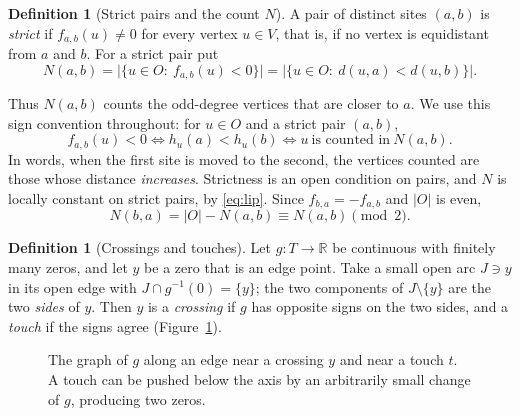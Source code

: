 \documentclass[11pt]{amsart}
\theoremstyle{definition}
\newtheorem{definition}[theorem]{Definition}
\theoremstyle{remark}
\newcommand{\Odd}{O}
\newcommand{\Ver}{V}
\newcommand{\N}{N}
\begin{document}
\begin{definition}[Strict pairs and the count $\N$]\label{def:strict}
A pair of distinct sites $(a,b)$ is \emph{strict} if $f_{a,b}(u)\ne0$ for every vertex $u\in\Ver$, that is, if no vertex is equidistant from $a$ and $b$. For a strict pair put
\[
  \N(a,b)=\bigl|\{u\in\Odd:\ f_{a,b}(u)<0\}\bigr| = \bigl|\{u\in\Odd:\ d(u,a)<d(u,b)\}\bigr|.
\]
\end{definition}

\noindent
Thus $\N(a,b)$ counts the odd-degree vertices that are closer to $a$. We use this sign convention throughout: for $u\in\Odd$ and a strict pair $(a,b)$,
\begin{equation}\label{eq:signconv}
  f_{a,b}(u)<0\iff h_u(a)<h_u(b)\iff u\ \text{is counted in}\ \N(a,b).
\end{equation}
In words, when the first site is moved to the second, the vertices counted are those whose distance \emph{increases}. Strictness is an open condition on pairs, and $\N$ is locally constant on strict pairs, by \eqref{eq:lip}. Since $f_{b,a}=-f_{a,b}$ and $|\Odd|$ is even,
\begin{equation}\label{eq:swap}
  \N(b,a)=|\Odd|-\N(a,b)\equiv \N(a,b)\pmod 2 .
\end{equation}

\begin{definition}[Crossings and touches]\label{def:crossing}
Let $g:T\to\mathbb R$ be continuous with finitely many zeros, and let $y$ be a zero that is an edge point. Take a small open arc $J\ni y$ in its open edge with $J\cap g^{-1}(0)=\{y\}$; the two components of $J\setminus\{y\}$ are the two \emph{sides} of $y$. Then $y$ is a \emph{crossing} if $g$ has opposite signs on the two sides, and a \emph{touch} if the signs agree (Figure~\ref{fig:crosstouch}).
\end{definition}

\begin{figure}[ht]
\centering
{}
\caption{The graph of $g$ along an edge near a crossing $y$ and near a touch $t$. A touch can be pushed below the axis by an arbitrarily small change of $g$, producing two zeros.}\label{fig:crosstouch}
\end{figure}
\end{document}

